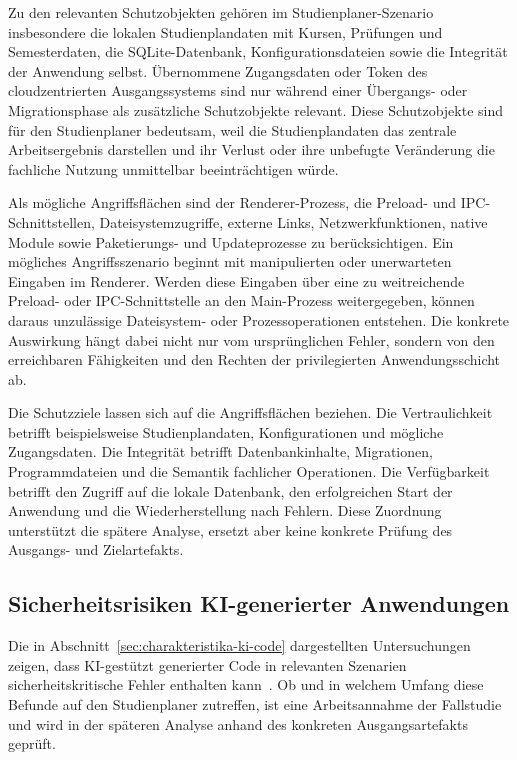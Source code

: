 Zu den relevanten Schutzobjekten gehören im Studienplaner-Szenario insbesondere die lokalen Studienplandaten mit Kursen, Prüfungen und Semesterdaten, die SQLite-Datenbank, Konfigurationsdateien sowie die Integrität der Anwendung selbst.
Übernommene Zugangsdaten oder Token des cloudzentrierten Ausgangssystems sind nur während einer Übergangs- oder Migrationsphase als zusätzliche Schutzobjekte relevant.
Diese Schutzobjekte sind für den Studienplaner bedeutsam, weil die Studienplandaten das zentrale Arbeitsergebnis darstellen und ihr Verlust oder ihre unbefugte Veränderung die fachliche Nutzung unmittelbar beeinträchtigen würde.

Als mögliche Angriffsflächen sind der Renderer-Prozess, die Preload- und IPC-Schnittstellen, Dateisystemzugriffe, externe Links, Netzwerkfunktionen, native Module sowie Paketierungs- und Updateprozesse zu berücksichtigen.
Ein mögliches Angriffsszenario beginnt mit manipulierten oder unerwarteten Eingaben im Renderer.
Werden diese Eingaben über eine zu weitreichende Preload- oder IPC-Schnittstelle an den Main-Prozess weitergegeben, können daraus unzulässige Dateisystem- oder Prozessoperationen entstehen.
Die konkrete Auswirkung hängt dabei nicht nur vom ursprünglichen Fehler, sondern von den erreichbaren Fähigkeiten und den Rechten der privilegierten Anwendungsschicht ab.

Die Schutzziele lassen sich auf die Angriffsflächen beziehen.
Die Vertraulichkeit betrifft beispielsweise Studienplandaten, Konfigurationen und mögliche Zugangsdaten.
Die Integrität betrifft Datenbankinhalte, Migrationen, Programmdateien und die Semantik fachlicher Operationen.
Die Verfügbarkeit betrifft den Zugriff auf die lokale Datenbank, den erfolgreichen Start der Anwendung und die Wiederherstellung nach Fehlern.
Diese Zuordnung unterstützt die spätere Analyse, ersetzt aber keine konkrete Prüfung des Ausgangs- und Zielartefakts.
\subsection{Sicherheitsrisiken KI-generierter Anwendungen}
\label{sec:risiken-ki-anwendungen}
Die in Abschnitt~\ref{sec:charakteristika-ki-code} dargestellten Untersuchungen zeigen, dass KI-gestützt generierter Code in relevanten Szenarien sicherheitskritische Fehler enthalten kann~\cite{perry2023users,pearce2022asleep,tihanyi2024secure,asare2023copilot}.
Ob und in welchem Umfang diese Befunde auf den Studienplaner zutreffen, ist eine Arbeitsannahme der Fallstudie und wird in der späteren Analyse anhand des konkreten Ausgangsartefakts geprüft.

